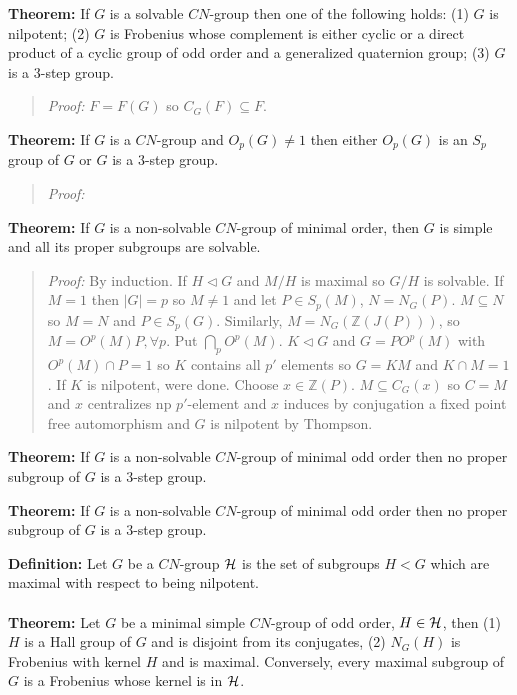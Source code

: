 {\bf Theorem:} If $G$ is a solvable $CN$-group then one of the following holds:
(1) $G$ is nilpotent;
(2) $G$ is Frobenius whose complement is either cyclic or a direct product of a cyclic group of
odd order and a generalized quaternion group;
(3) $G$ is a $3$-step group.
\begin{quote}
\emph{Proof:}
$F=F(G)$ so $C_G(F) \subseteq F$.
\end{quote}
{\bf Theorem:} 
If $G$ is a $CN$-group and $O_p(G) \ne 1$ then either $O_p(G)$ is an $S_p$ group
of $G$ or $G$ is a $3$-step group.
\begin{quote}
\emph{Proof:}
\end{quote}
{\bf Theorem:} If $G$ is a non-solvable $CN$-group of
minimal order, then $G$ is simple and all its proper subgroups are solvable.
\begin{quote}
\emph{Proof:}
By induction.  If $H \lhd G$ and $M/H$ is maximal so $G/H$ is solvable.  If $M=1$ then $|G|=p$ so
$M \ne 1$ and let $P \in S_p(M)$, $N= N_G(P)$.  $M \subseteq N$ so $M=N$ and $P \in S_p(G)$.
Similarly, $M = N_G({\mathbb Z}(J(P)))$, so $M=O^p(M)P, \forall p$.  Put $\bigcap_p O^p(M)$.
$K \lhd G$ and $G = PO^p(M)$ with $O^p(M) \cap P = 1$ so $K$ contains all $p'$ elements
so $G=KM$ and $K \cap M =1$.  If $K$ is nilpotent, were done. Choose $x \in {\mathbb Z}(P)$.
$M \subseteq C_G(x)$ so $C=M$ and $x$ centralizes np $p'$-element and $x$ induces by conjugation
a fixed point free automorphism and $G$ is nilpotent by Thompson.
\end{quote}
{\bf Theorem:} If $G$ is a non-solvable $CN$-group of minimal odd order
then no proper subgroup of $G$ is a $3$-step group.
\begin{quote}
\end{quote}
{\bf Theorem:} If $G$ is a non-solvable $CN$-group of minimal odd order then no proper
subgroup of $G$ is a $3$-step group.
\begin{quote}
\end{quote}
{\bf Definition:}  Let $G$ be a $CN$-group ${\cal H}$ is the set of subgroups $H < G$ which are
maximal with respect to being nilpotent.
\\
\\
{\bf Theorem:} 
Let $G$ be a minimal simple $CN$-group of odd order, $H \in {\cal H}$, then (1)
$H$ is a Hall group of $G$ and is disjoint from its conjugates, (2) $N_G(H)$ is Frobenius with
kernel $H$ and is maximal.  Conversely, every maximal subgroup of $G$ is a Frobenius whose
kernel is in ${\cal H}$.
\begin{quote}
\end{quote}
